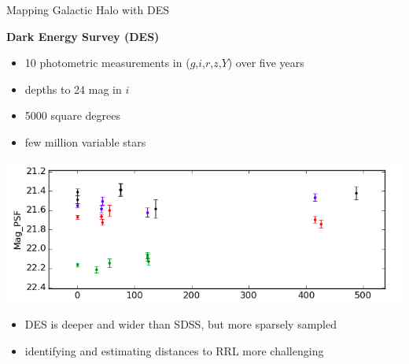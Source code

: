 \documentclass[12pt]{beamer}
\begin{document}


\begin{frame}{Mapping Galactic Halo with DES}

\textbf{Dark Energy Survey (DES)}
\begin{itemize}
\item 10 photometric measurements in ($g$,$i$,$r$,$z$,$Y$) over five years
\item depths to 24 mag in $i$
\item 5000 square degrees
\item few million variable stars
\end{itemize}

\vspace{.2in}

\begin{center}
  \includegraphics[scale=0.3]{figs/des2.png}
  \end{center}


\begin{itemize}
\item DES is deeper and wider than SDSS, but more sparsely sampled
\item identifying and estimating distances to RRL more challenging
\end{itemize}


\end{frame}

\end{document}

